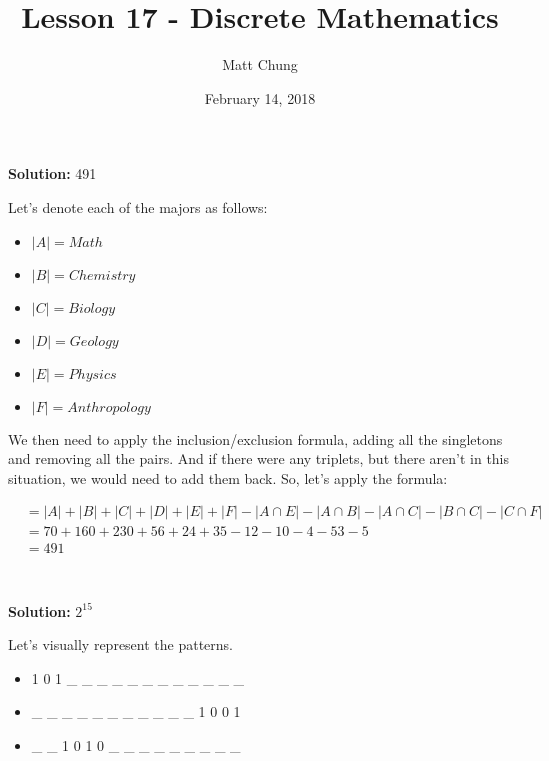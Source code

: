 \documentclass{article}
\title{Lesson 17 - Discrete Mathematics}
\author{Matt Chung}
\date{February 14, 2018}
\begin{document}
\maketitle

\section{}
\textbf{Solution: } 491

Let's denote each of the majors as follows:

\begin{itemize}
    \item $|A| =  Math$
    \item $|B| = Chemistry$
    \item $|C| = Biology$
    \item $|D| = Geology$
    \item $|E| = Physics$
    \item $|F| = Anthropology$
\end{itemize}

We then need to apply the inclusion/exclusion formula, adding all the singletons and removing all the pairs. And if there were any triplets, but there aren't in this situation, we would need to add them back. So, let's apply the formula:

\begin{align*}
   &= |A| + |B| + |C| + |D| + |E| + |F| - |A \cap E| - |A \cap B| - |A \cap C| - |B \cap C| - |C \cap F| \\
   &= 70 + 160 + 230 + 56 + 24 + 35 - 12 - 10 - 4 - 53 - 5 \\
   & = 491 \\
\end{align*}


\newpage

\section{}

\textbf{Solution: } $2^{15}$

Let's visually represent the patterns.

\begin{itemize}[label={}]
  \item 1 0 1 \_ \_ \_ \_ \_ \_ \_ \_ \_ \_ \_ \_
  \item \_ \_ \_ \_ \_ \_ \_ \_ \_ \_ \_ 1 0 0 1
  \item \_ \_ 1 0 1 0 \_ \_ \_ \_ \_ \_ \_ \_ \_
\end{itemize}
\end{document}
